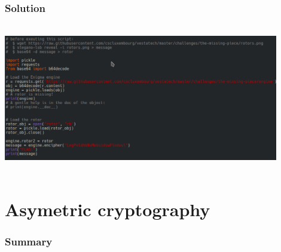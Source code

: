 \documentclass[]{beamer}
\begin{document}
\begin{frame}
\frametitle{Solution}
\begin{center}
    \includegraphics[height=6.5cm, width=12.0cm]{./images/Enigma_solution.png}
\end{center}
\end{frame}






%
%
\section{Asymetric cryptography}
\begin{frame}
\frametitle{Summary}
\begin{columns}[t]
\begin{column}{5cm}
\tableofcontents[sections={1-3}, currentsection, hideothersubsections]
\end{column}
\begin{column}{5cm}
\tableofcontents[sections={4-5}, currentsection, hideothersubsections]
\end{column}
\end{columns}
\end{frame}
\end{document}
